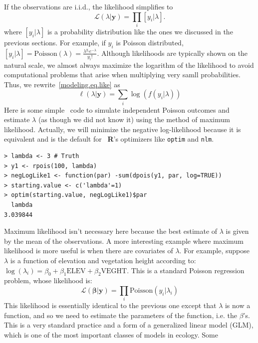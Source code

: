 If the observations are i.i.d., the likelihood simplifies to
\begin{equation}
  \mathcal{L}(\lambda | \mathbf{y}) = \prod_i [y_i | \lambda].
  \label{modeling.eq.like}
\end{equation}
where $[y_i | \lambda]$ is a probability distribution like the ones
we discussed in the previous sections. For example, if $y_i$ is
Poisson distributed, $[y_i | \lambda] = \text{Poisson}(\lambda) =
\frac{\lambda^{y_i}e^{-\lambda}}{y_i!}$.
Although likelihoods are typically shown on the natural scale, we
almost always maximize the logarithm of the likelihood to
avoid computational problems that arise when multiplying very samll
probabilities. Thus, we rewrite~\ref{modeling.eq.like} as
\begin{equation}
  \ell(\lambda | \mathbf{y}) = \sum_i \log(f(y_i | \lambda))
  \label{modeling.eq.like}
\end{equation}
Here is some simple \R~code to simulate independent Poisson outcomes
and estimate $\lambda$ (as though we did not know it) using the
method of maximum likelihood. Actually, we will minimize the negative
log-likelihood because it is equivalent and is the default for ~{\bf R}'s
optimizers like \verb+optim+ and \verb+nlm+.
\begin{verbatim}
> lambda <- 3 # Truth
> y1 <- rpois(100, lambda)
> negLogLike1 <- function(par) -sum(dpois(y1, par, log=TRUE))
> starting.value <- c('lambda'=1)
> optim(starting.value, negLogLike1)$par
  lambda
3.039844
\end{verbatim}
Maximum likelihood isn't necessary here because the best estimate of
$\lambda$ is given by the mean of the observations. A more interesting
example where maximum likelihood is more useful is when there are
covariates of $\lambda$. For example, suppose $\lambda$ is a function
of elevation and vegetation height according to: $\log(\lambda_i) =
\beta_0 + \beta_1\text{ELEV} + \beta_2\text{VEGHT}$. This is a
standard Poisson regression problem, whose likelihood is:
\begin{equation}
  \mathcal{L}(\bm{\beta} | \mathbf{y}) = \prod_i \text{Poisson}(y_i | \lambda_i)
  \label{modeling.eq.like}
\end{equation}
This likelihood is essentially identical to the previous one except
that $\lambda$ is now a function, and so we need to estimate the
parameters of the function, i.e. the $\beta$'s. This is a very
standard practice and a form of a generalized linear model (GLM),
which is one of the most important classes of models in ecology. Some
